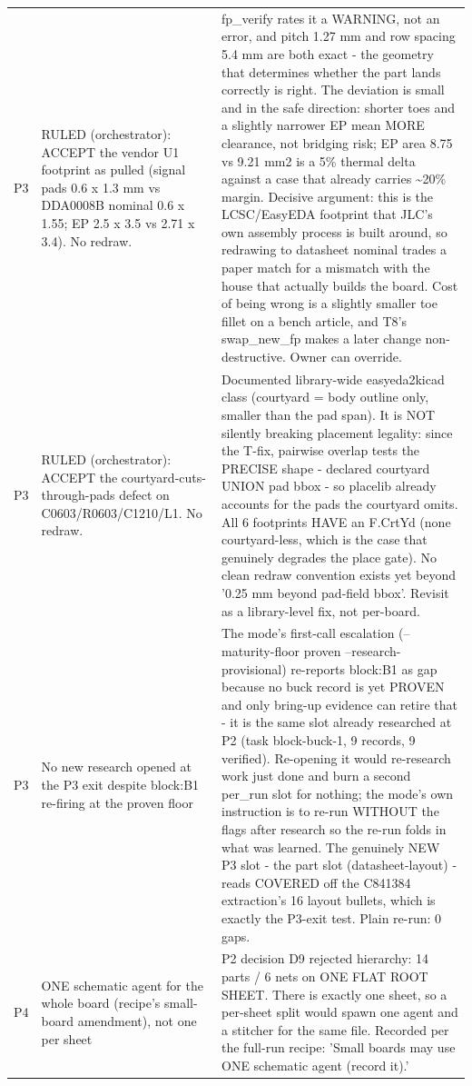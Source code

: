 \documentclass[11pt,a4paper]{article}
\begin{document}
{\begin{longtable}{lp{5.2cm}p{7.2cm}}
P3 & RULED (orchestrator): ACCEPT the vendor U1 footprint as pulled (signal pads 0.6 x 1.3 mm vs DDA0008B nominal 0.6 x 1.55; EP 2.5 x 3.5 vs 2.71 x 3.4). No redraw. & fp\_verify rates it a WARNING, not an error, and pitch 1.27 mm and row spacing 5.4 mm are both exact - the geometry that determines whether the part lands correctly is right. The deviation is small and in the safe direction: shorter toes and a slightly narrower EP mean MORE clearance, not bridging risk; EP area 8.75 vs 9.21 mm2 is a 5\% thermal delta against a case that already carries \textasciitilde{}20\% margin. Decisive argument: this is the LCSC/EasyEDA footprint that JLC's own assembly process is built around, so redrawing to datasheet nominal trades a paper match for a mismatch with the house that actually builds the board. Cost of being wrong is a slightly smaller toe fillet on a bench article, and T8's swap\_new\_fp makes a later change non-destructive. Owner can override. \\
P3 & RULED (orchestrator): ACCEPT the courtyard-cuts-through-pads defect on C0603/R0603/C1210/L1. No redraw. & Documented library-wide easyeda2kicad class (courtyard = body outline only, smaller than the pad span). It is NOT silently breaking placement legality: since the T-fix, pairwise overlap tests the PRECISE shape - declared courtyard UNION pad bbox - so placelib already accounts for the pads the courtyard omits. All 6 footprints HAVE an F.CrtYd (none courtyard-less, which is the case that genuinely degrades the place gate). No clean redraw convention exists yet beyond '0.25 mm beyond pad-field bbox'. Revisit as a library-level fix, not per-board. \\
P3 & No new research opened at the P3 exit despite block:B1 re-firing at the proven floor & The mode's first-call escalation (--maturity-floor proven --research-provisional) re-reports block:B1 as gap because no buck record is yet PROVEN and only bring-up evidence can retire that - it is the same slot already researched at P2 (task block-buck-1, 9 records, 9 verified). Re-opening it would re-research work just done and burn a second per\_run slot for nothing; the mode's own instruction is to re-run WITHOUT the flags after research so the re-run folds in what was learned. The genuinely NEW P3 slot - the part slot (datasheet-layout) - reads COVERED off the C841384 extraction's 16 layout bullets, which is exactly the P3-exit test. Plain re-run: 0 gaps. \\
P4 & ONE schematic agent for the whole board (recipe's small-board amendment), not one per sheet & P2 decision D9 rejected hierarchy: 14 parts / 6 nets on ONE FLAT ROOT SHEET. There is exactly one sheet, so a per-sheet split would spawn one agent and a stitcher for the same file. Recorded per the full-run recipe: 'Small boards may use ONE schematic agent (record it).' \\

\end{longtable}}
\end{document}
